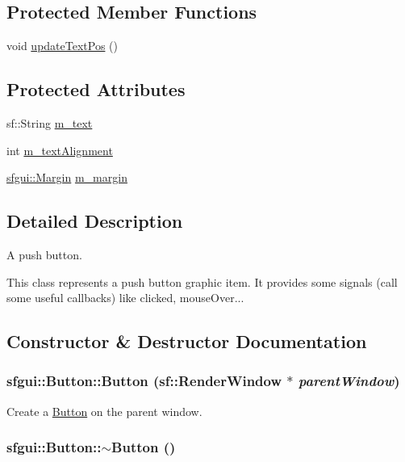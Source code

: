 \subsection*{Protected Member Functions}
\begin{CompactItemize}
\item 
void \hyperlink{classsfgui_1_1Button_1e1eade317f3b603011067e4997b0725}{updateTextPos} ()
\end{CompactItemize}
\subsection*{Protected Attributes}
\begin{CompactItemize}
\item 
sf::String \hyperlink{classsfgui_1_1Button_5a436a029fef79723eed0b024b5a7693}{m\_\-text}
\item 
int \hyperlink{classsfgui_1_1Button_b1ca3893cbff9b09f42e16377c0073f9}{m\_\-textAlignment}
\item 
\hyperlink{structsfgui_1_1Margin}{sfgui::Margin} \hyperlink{classsfgui_1_1Button_20ee48b44f31ad5b5de11dc3b00103a7}{m\_\-margin}
\end{CompactItemize}


\subsection{Detailed Description}
A push button. 

This class represents a push button graphic item. It provides some signals (call some useful callbacks) like clicked, mouseOver... 

\subsection{Constructor \& Destructor Documentation}
\hypertarget{classsfgui_1_1Button_05c78461b775a073bed1e218586defd7}{
\subsubsection[Button]{\setlength{\rightskip}{0pt plus 5cm}sfgui::Button::Button (sf::RenderWindow $\ast$ {\em parentWindow})}}
\label{classsfgui_1_1Button_05c78461b775a073bed1e218586defd7}




Create a \hyperlink{classsfgui_1_1Button}{Button} on the parent window. \hypertarget{classsfgui_1_1Button_835b0cbc92ef98e4c884398e036d26ca}{
\subsubsection[$\sim$Button]{\setlength{\rightskip}{0pt plus 5cm}sfgui::Button::$\sim$Button ()}}
\label{classsfgui_1_1Button_835b0cbc92ef98e4c884398e036d26ca}




